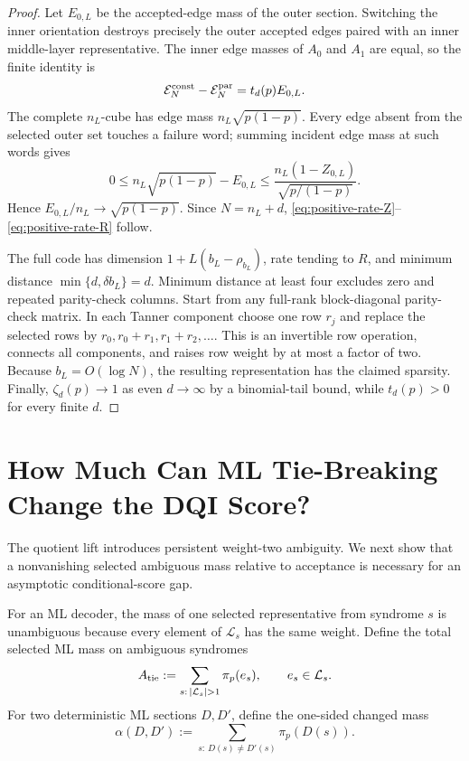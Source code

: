 \documentclass[journal]{IEEEtran}
\theoremstyle{definition}
\theoremstyle{remark}
\begin{document}
\begin{proof}
Let $E_{0,L}$ be the accepted-edge mass of the outer section.  Switching the
inner orientation destroys precisely the outer accepted edges paired with an
inner middle-layer representative.  The inner edge masses of $A_0$ and $A_1$
are equal, so the finite identity is
\begin{equation}
 \mathcal E_N^{\rm const}-\mathcal E_N^{\rm par}=t_d(p)E_{0,L}.
 \label{eq:positive-rate-finite-gap}
\end{equation}
The complete $n_L$-cube has edge mass
$n_L\sqrt{p(1-p)}$.  Every edge absent from the selected outer set touches a
failure word; summing incident edge mass at such words gives
\begin{equation}
 0\le n_L\sqrt{p(1-p)}-E_{0,L}
 \le \frac{n_L(1-Z_{0,L})}{\sqrt{p/(1-p)}}.
 \label{eq:outer-edge-reliability}
\end{equation}
Hence $E_{0,L}/n_L\to\sqrt{p(1-p)}$.  Since $N=n_L+d$,
\eqref{eq:positive-rate-Z}--\eqref{eq:positive-rate-R} follow.

The full code has dimension $1+L(b_L-\rho_{b_L})$, rate tending to $R$, and
minimum distance $\min\{d,\delta b_L\}=d$.  Minimum distance at least four
excludes zero and repeated parity-check columns.  Start from any full-rank
block-diagonal parity-check matrix.  In each Tanner component choose one row
$r_j$ and replace the selected rows by
$r_0,r_0+r_1,r_1+r_2,\ldots$.  This is an invertible row operation, connects
all components, and raises row weight by at most a factor of two.  Because
$b_L=O(\log N)$, the resulting representation has the claimed sparsity.
Finally, $\zeta_d(p)\to1$ as even $d\to\infty$ by a binomial-tail bound,
while $t_d(p)>0$ for every finite $d$.
\end{proof}

\section{How Much Can ML Tie-Breaking Change the DQI Score?}
\label{sec:ambiguity}

The quotient lift introduces persistent weight-two ambiguity.  We next show
that a nonvanishing selected ambiguous mass relative to acceptance is necessary
for an asymptotic conditional-score gap.

For an ML decoder, the mass of one selected representative from syndrome $s$
is unambiguous because every element of $\mathcal L_s$ has the same weight.
Define the total selected ML mass on ambiguous syndromes
\begin{equation}
 A_{\rm tie}:=\sum_{s:\,|\mathcal L_s|>1}\pi_p(e_s),
 \qquad e_s\in\mathcal L_s.
 \label{eq:tie-mass}
\end{equation}
For two deterministic ML sections $D,D'$, define the one-sided changed mass
\begin{equation}
 \alpha(D,D'):=\sum_{s:\,D(s)\ne D'(s)}\pi_p(D(s)).
 \label{eq:alpha}
\end{equation}
\end{document}
